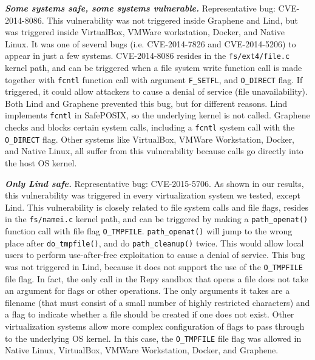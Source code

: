 {{\emph{\textbf{Some systems safe, some systems vulnerable.}}  Representative bug: CVE-2014-8086.
This vulnerability was not triggered inside Graphene and Lind, but was triggered inside
VirtualBox, VMWare workstation, Docker, and Native Linux. It was one of several
bugs (i.e. CVE-2014-7826 and CVE-2014-5206) to appear in just a few systems.
CVE-2014-8086 resides in the \texttt{fs/ext4/file.c} kernel path, and can be
triggered when a file system write
function call is made together with \texttt{fcntl} function call
with argument \texttt{F\_SETFL}, and \texttt{O\_DIRECT} flag. If triggered, it could
allow attackers to cause a denial of service (file unavailability). Both Lind and
Graphene prevented this bug, but for different reasons. Lind
implements \texttt{fcntl} in SafePOSIX, so the underlying kernel is not called.
Graphene checks and blocks certain system calls, including
a \texttt{fcntl} system call with the \texttt{O\_DIRECT} flag.
Other systems like VirtualBox, VMWare Workstation, Docker, and Native Linux,
all suffer from this vulnerability because calls go directly into the host OS
kernel.

\emph{\textbf{Only Lind safe.}}  Representative bug: CVE-2015-5706. As
shown in our results, this vulnerability was triggered in every
virtualization system we tested, except Lind. This vulnerability
is closely related to file system calls and file flags, resides in the \texttt{fs/namei.c}
kernel path, and can be triggered by making a \texttt{path\_openat()} function
call with file flag \texttt{O\_TMPFILE}. \texttt{path\_openat()} will jump to the wrong
place after \texttt{do\_tmpfile()}, and do \texttt{path\_cleanup()} twice. This would
allow local users to perform use-after-free exploitation to cause a denial of service.
This bug was not triggered in Lind, because it does not support the use of the
\texttt{O\_TMPFILE} file flag. In fact, the only call in the Repy sandbox that
opens a file does not take an argument for flags or other operations.  The
only arguments it takes are a filename (that must consist of a small number
of highly restricted characters) and a flag to indicate whether a file should
be created if one does not exist.
Other virtualization systems allow more complex configuration of flags to
pass through to the underlying OS kernel.
In this case, the \texttt{O\_TMPFILE} file flag was
allowed in Native Linux, VirtualBox, VMWare Workstation, Docker, and Graphene.

}}
